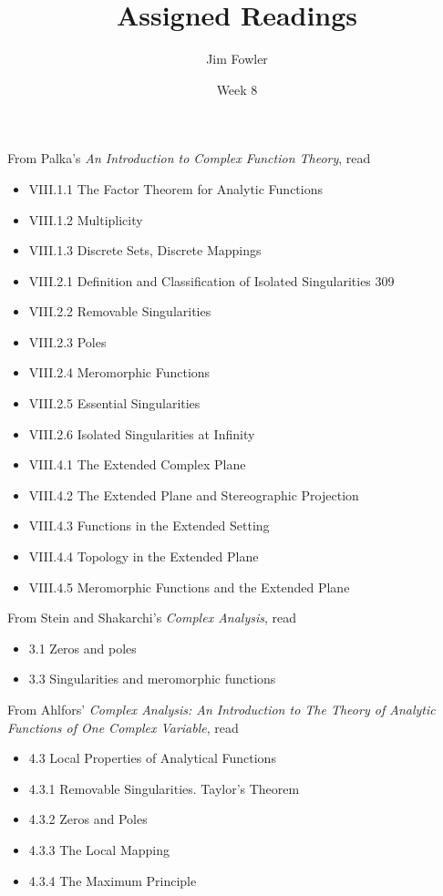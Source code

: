 \documentclass{homework}
\author{Jim Fowler}
\title{Assigned Readings}
\date{Week 8}
\begin{document}
\maketitle


From Palka's \textit{An Introduction to Complex Function Theory}, read
\begin{itemize}
\item VIII.1.1 The Factor Theorem for Analytic Functions
\item VIII.1.2 Multiplicity
\item VIII.1.3 Discrete Sets, Discrete Mappings
\item VIII.2.1 Definition and Classification of Isolated Singularities 309
\item VIII.2.2 Removable Singularities
\item VIII.2.3 Poles
\item VIII.2.4 Meromorphic Functions
\item VIII.2.5 Essential Singularities
\item VIII.2.6 Isolated Singularities at Infinity
\item VIII.4.1 The Extended Complex Plane
\item VIII.4.2 The Extended Plane and Stereographic Projection
\item VIII.4.3 Functions in the Extended Setting
\item VIII.4.4 Topology in the Extended Plane
\item VIII.4.5 Meromorphic Functions and the Extended Plane
\end{itemize}

From Stein and Shakarchi's \textit{Complex Analysis}, read
\begin{itemize}
\item 3.1 Zeros and poles
\item 3.3 Singularities and meromorphic functions
\end{itemize}

From Ahlfors' \textit{Complex Analysis: An Introduction to The Theory of Analytic Functions of One Complex Variable}, read
\begin{itemize}
\item 4.3 Local Properties of Analytical Functions
\item 4.3.1 Removable Singularities. Taylor's Theorem
\item 4.3.2 Zeros and Poles
\item 4.3.3 The Local Mapping
\item 4.3.4 The Maximum Principle
\end{itemize}
\end{document}
